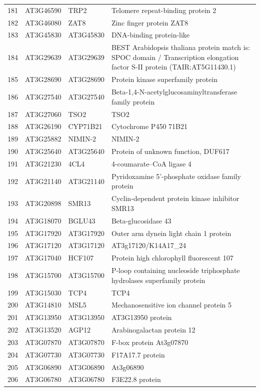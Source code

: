 \documentclass[11pt]{article}
\begin{document}
\begin{center}
\begin{tabular}{rlll}
181 & AT3G46590 & TRP2 & Telomere repeat-binding protein 2\\
182 & AT3G46080 & ZAT8 & Zinc finger protein ZAT8\\
183 & AT3G45830 & AT3G45830 & DNA-binding protein-like\\
184 & AT3G29639 & AT3G29639 & BEST Arabidopsis thaliana protein match is: SPOC domain / Transcription elongation factor S-II protein (TAIR:AT5G11430.1)\\
185 & AT3G28690 & AT3G28690 & Protein kinase superfamily protein\\
186 & AT3G27540 & AT3G27540 & Beta-1,4-N-acetylglucosaminyltransferase family protein\\
187 & AT3G27060 & TSO2 & TSO2\\
188 & AT3G26190 & CYP71B21 & Cytochrome P450 71B21\\
189 & AT3G25882 & NIMIN-2 & NIMIN-2\\
190 & AT3G25640 & AT3G25640 & Protein of unknown function, DUF617\\
191 & AT3G21230 & 4CL4 & 4-coumarate--CoA ligase 4\\
192 & AT3G21140 & AT3G21140 & Pyridoxamine 5'-phosphate oxidase family protein\\
193 & AT3G20898 & SMR13 & Cyclin-dependent protein kinase inhibitor SMR13\\
194 & AT3G18070 & BGLU43 & Beta-glucosidase 43\\
195 & AT3G17920 & AT3G17920 & Outer arm dynein light chain 1 protein\\
196 & AT3G17120 & AT3G17120 & AT3g17120/K14A17\_24\\
197 & AT3G17040 & HCF107 & Protein high chlorophyll fluorescent 107\\
198 & AT3G15700 & AT3G15700 & P-loop containing nucleoside triphosphate hydrolases superfamily protein\\
199 & AT3G15030 & TCP4 & TCP4\\
200 & AT3G14810 & MSL5 & Mechanosensitive ion channel protein 5\\
201 & AT3G13950 & AT3G13950 & AT3G13950 protein\\
202 & AT3G13520 & AGP12 & Arabinogalactan protein 12\\
203 & AT3G07870 & AT3G07870 & F-box protein At3g07870\\
204 & AT3G07730 & AT3G07730 & F17A17.7 protein\\
205 & AT3G06890 & AT3G06890 & At3g06890\\
206 & AT3G06780 & AT3G06780 & F3E22.8 protein\\

\end{tabular}
\end{center}
\end{document}
